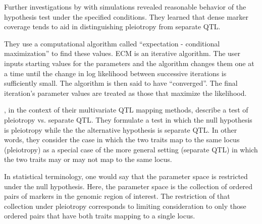\documentclass[]{article}\usepackage[]{graphicx}\usepackage[]{color}
\begin{document}
Further investigations by \citet{jiang1995multiple} with simulations revealed
reasonable behavior of the hypothesis test under the specified conditions. 
They learned that dense marker coverage tends to aid in distinguishing pleiotropy
from separate QTL. 










They use a computational algorithm called ``expectation - conditional maximization'' to find these values. 
ECM is an iterative algorithm. 
The user inputs starting values for the parameters and the algorithm changes them one at a
time until the change in log likelihood between successive iterations is sufficiently small.
The algorithm is then said to have ``converged''. 
The final iteration’s parameter values are treated as those that maximize the likelihood.


\citet{jiang1995multiple}, in the context of their multivariate QTL mapping methods, 
describe a test of pleiotropy vs. separate QTL. 
They formulate a test in which the null hypothesis
is pleiotropy while the the alternative hypothesis is separate QTL.
In other words, they consider the case in which the two traits map to the same locus
(pleiotropy) as a special case of the more general setting (separate QTL)
in which the two traits may or may not map to the same locus.

In statistical terminology, one would say that the parameter space is restricted under the null hypothesis. Here, the parameter space is the collection of ordered pairs of markers in the genomic region of interest. The restriction of that collection under pleiotropy corresponds to limiting consideration to only those ordered pairs that have both traits mapping to a single locus. 
\end{document}
